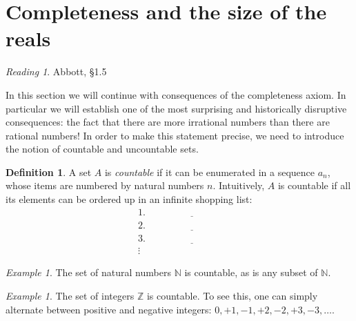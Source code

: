 \documentclass[11pt,oneside]{amsbook}
\newcommand{\N}{\mathbb N}
\newcommand{\Z}{\mathbb Z}
\theoremstyle{definition}
\theoremstyle{plain}
\theoremstyle{definition}
\newtheorem{definition}[theorem]{Definition}
\theoremstyle{remark}
\newtheorem{example}[theorem]{Example}
\newtheorem*{reading}{Reading}
\numberwithin{equation}{section}
\numberwithin{figure}{section}
\begin{document}
\newpage
\section{Completeness and the size of the reals}

\begin{reading}
  Abbott, \S 1.5
\end{reading}

In this section we will continue with consequences of the completeness axiom. In particular we will establish one of the most surprising and historically disruptive consequences: the fact that there are more irrational numbers than there are rational numbers! In order to make this statement precise, we need to introduce the notion of countable and uncountable sets.

\begin{definition}
  A set $A$ is \emph{countable} if it can be enumerated in a sequence $a_n$, whose items are numbered by natural numbers $n$. Intuitively, $A$ is countable if all its elements can be ordered up in an infinite shopping list:
  \begin{align*}
    1.&\quad\underline{\hspace{1in}}\\
    2.&\quad\underline{\hspace{1in}}\\
    3.&\quad\underline{\hspace{1in}}\\
    \vdots&
  \end{align*}
\end{definition}

\begin{example}
  The set of natural numbers $\N$ is countable, as is any subset of $\N$.
\end{example}

\begin{example}
  The set of integers $\Z$ is countable. To see this, one can simply alternate between positive and negative integers: $0,+1,-1,+2,-2,+3,-3,\ldots$.
\end{example}
\end{document}

